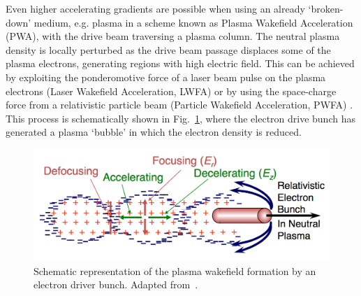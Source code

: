 Even higher accelerating gradients are possible when using an already `broken-down' medium, e.g. plasma \cite{PhysRevLett.43.267,Chen:1984up} in a scheme known as Plasma Wakefield Acceleration (PWA), with the drive beam traversing a plasma column. The neutral plasma density is locally perturbed as the drive beam passage displaces some of the plasma electrons, generating regions with high electric field. This can be achieved by exploiting the ponderomotive force of a laser beam pulse on the plasma electrons (Laser Wakefield Acceleration, LWFA) \cite{Mangles:2004ta, Faure:2004tc} or by using the space-charge force from a relativistic particle beam (Particle Wakefield Acceleration, PWFA) \cite{Blumenfeld:2007ph, Litos:2014yqa}. This process is schematically shown in Fig.~\ref{fig:plasma-acc-scheme}, where the electron drive bunch has generated a plasma `bubble' in which the electron density is reduced. 


\begin{figure}[!t]
\centering
\includegraphics[width=140mm, keepaspectratio]{pictures/Plasma_schematic}
\caption{Schematic representation of the plasma wakefield formation by an electron driver bunch. Adapted from~\cite{Muggli:2203633}.}
\label{fig:plasma-acc-scheme}
\end{figure}


